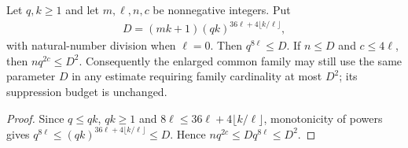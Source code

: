 \begin{lemma}
    \label{thm:precenter_collar_count}
    \leanok
    Let $q,k\ge1$ and let $m,\ell,n,c$ be nonnegative integers. Put
    \begin{align}
        D=(mk+1)(qk)^{36\ell+4\lfloor k/\ell\rfloor},
    \end{align}
    with natural-number division when $\ell=0$. Then $q^{8\ell}\le D$.
    If $n\le D$ and $c\le4\ell$, then $nq^{2c}\le D^2$.
    Consequently the enlarged common family may still use the same
    parameter $D$ in any estimate requiring family cardinality at most
    $D^2$; its suppression budget is unchanged.
\end{lemma}
\begin{proof}\leanok
    Since $q\le qk$, $qk\ge1$ and
    $8\ell\le36\ell+4\lfloor k/\ell\rfloor$, monotonicity of powers
    gives $q^{8\ell}\le(qk)^{36\ell+4\lfloor k/\ell\rfloor}\le D$.
    Hence $nq^{2c}\le Dq^{8\ell}\le D^2$.
\end{proof}

